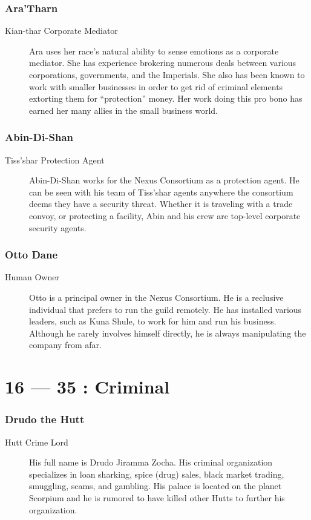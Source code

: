 \documentclass{article}
\begin{document}
\section{Ara’Tharn}
\begin{description}
	\item [Kian-thar \female Corporate Mediator] Ara uses her race’s natural ability to sense emotions as a corporate mediator. She has experience brokering numerous deals between various corporations, governments, and the Imperials. She also has been known to work with smaller businesses in order to get rid of criminal elements extorting them for “protection” money. Her work doing this pro bono has earned her many allies in the small business world.
	\end{description}
\section{Abin-Di-Shan}
\begin{description}
	\item [Tiss’shar \male Protection Agent] Abin-Di-Shan works for the Nexus Consortium as a protection agent. He can be seen with his team of Tiss’shar agents anywhere the consortium deems they have a security threat. Whether it is traveling with a trade convoy, or protecting a facility, Abin and his crew are top-level corporate security agents.
	\end{description}
\section{Otto Dane}
\begin{description}
	\item [Human \male Owner] Otto is a principal owner in the Nexus Consortium. He is a reclusive individual that prefers to run the guild remotely. He has installed various leaders, such as Kuna Shule, to work for him and run his business. Although he rarely involves himself directly, he is always manipulating the company from afar.
	\end{description}

\part*{16 --- 35 : Criminal}
\setcounter{section}{15}
\section{Drudo the Hutt}
\begin{description}
	\item [Hutt \male Crime Lord] His full name is Drudo Jiramma Zocha. His criminal organization specializes in loan sharking, spice (drug) sales, black market trading, smuggling, scams, and gambling. His palace is located on the planet Scorpium and he is rumored to have killed other Hutts to further his organization.
\end{description}
\end{document}
